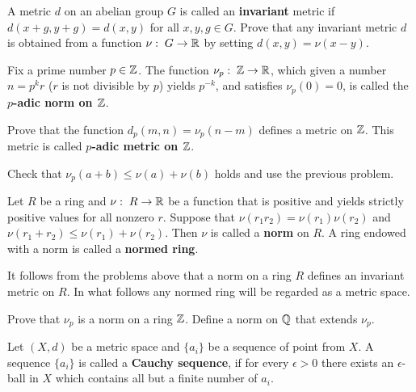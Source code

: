 \documentclass[12pt]{article}
\begin{document}
\begin{zadacha} A metric $d$ on an abelian group $G$ is called an
{\bf invariant} metric if $d(x+g, y+g) = d(x,y)$ for all $x, y, g
\in G$. Prove that any invariant metric $d$ 
is obtained from a function $\nu:\; G \to {\mathbb R}$ by setting $d(x, y) = \nu
(x-y)$.
\end{zadacha}

\begin{opredelenie} 
Fix a prime number $p\in {\mathbb Z}$. The function $\nu_p:\; {\mathbb Z}
\to {\mathbb R}$, which given a number $n = p^k r$ ($r$ is not divisible by
$p$) yields  $p^{-k}$, and  satisfies $\nu_p(0)=0$,  is called the 
{\bf $p$-adic norm on ${\mathbb Z}$}.
\end{opredelenie}

\begin{zadacha} Prove that the function  $d_p(m, n) = \nu_p(n-m)$
defines a metric on ${\mathbb Z}$. This metric is called {\bf $p$-adic metric on ${\mathbb Z}$}.
\end{zadacha}

\begin{ukazanie} Check that $\nu_p(a+b) \leq \nu(a) +
\nu(b)$ holds and use the previous problem.
\end{ukazanie}

\begin{opredelenie} Let $R$ be a ring and $\nu:\; R \to {\mathbb R}$ be a
  function that is positive and yields strictly positive values for
  all nonzero $r$. Suppose that $\nu(r_1 r_2) =
\nu(r_1) \nu(r_2)$ and $\nu(r_1+r_2) \leq \nu(r_1) + \nu(r_2)$.
Then $\nu$ is called a {\bf norm} on $R$. A ring endowed with
a norm is called a {\bf normed ring}.
\end{opredelenie}

\begin{zamechanie} It follows from the problems above that a norm on a
  ring $R$ defines an invariant metric on $R$. In what follows any
  normed ring will be regarded as a metric space.
\end{zamechanie}

\begin{zadacha} Prove that $\nu_p$ is a norm on a ring  ${\mathbb Z}$. Define a
  norm on ${\mathbb Q}$ that extends $\nu_p$.
\end{zadacha}


\begin{opredelenie} Let $(X, d)$ be a metric space and $\{a_i\}$ be a
  sequence of point from $X$. A sequence $\{a_i\}$ is called a {\bf
    Cauchy sequence}, if for every $\epsilon>0$ there exists an
  $\epsilon$-ball in $X$ which contains all but a finite number of
  $a_i$.
\end{opredelenie}
\end{document}
